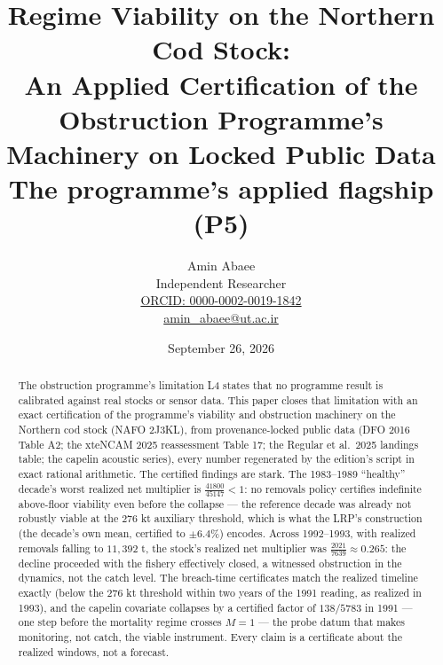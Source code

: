 \documentclass[10pt,twocolumn]{article}
\theoremstyle{plain}
\theoremstyle{remark}
\begin{document}
\title{Regime Viability on the Northern Cod Stock:\\
An Applied Certification of the Obstruction Programme's\\
Machinery on Locked Public Data\\[0.2em]
{\large\rmfamily The programme's applied flagship (P5)}}
\author{Amin Abaee\\[0.35em]
{\small Independent Researcher}\\[0.55em]
{\small\href{https://orcid.org/0000-0002-0019-1842}{ORCID: 0000-0002-0019-1842}}\\[0.3em]
{\small\href{mailto:amin\_abaee@ut.ac.ir}{amin\_abaee@ut.ac.ir}}}
\date{September 26, 2026}
\maketitle

\begin{abstract}
The obstruction programme's limitation L4 states that no programme result
is calibrated against real stocks or sensor data. This paper closes that
limitation with an exact certification of the programme's viability and
obstruction machinery on the Northern cod stock (NAFO 2J3KL), from
provenance-locked public data (DFO 2016 Table A2; the xteNCAM 2025
reassessment Table 17; the Regular et al.\ 2025 landings table; the
capelin acoustic series), every number regenerated by the edition's
script in exact rational arithmetic. The certified findings are stark.
The 1983--1989 ``healthy'' decade's worst realized net multiplier is
\(\tfrac{41800}{45147} < 1\): no removals policy certifies indefinite
above-floor viability even before the collapse --- the reference decade
was already not robustly viable at the \(276\) kt auxiliary threshold,
which is what the LRP's construction (the decade's own mean, certified
to \(\pm 6.4\%\)) encodes. Across 1992--1993, with realized removals
falling to \(11{,}392\) t, the stock's realized net multiplier was
\(\tfrac{2021}{7639} \approx 0.265\): the decline proceeded with the
fishery effectively closed, a witnessed obstruction in the dynamics, not
the catch level. The breach-time certificates match the realized
timeline exactly (below the \(276\) kt threshold within two years of the
1991 reading, as realized in 1993), and the capelin covariate collapses
by a certified factor of \(138/5783\) in 1991 --- one step before the
mortality regime crosses \(M = 1\) --- the probe datum that makes
monitoring, not catch, the viable instrument. Every claim is a
certificate about the realized windows, not a forecast.
\end{abstract}
\end{document}
